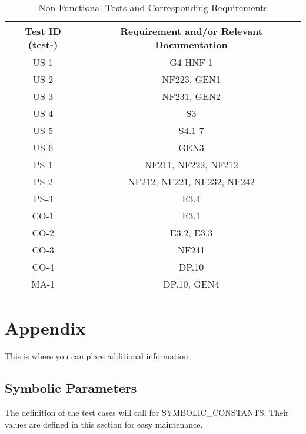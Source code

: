 \documentclass[12pt, titlepage]{article}
\begin{document}
\begin{table}[h!]
  \centering
  \caption{Non-Functional Tests and Corresponding Requirements}
  \begin{tabular}{c c}
    \hline
    \textbf{Test ID (test-)} & \textbf{Requirement and/or Relevant Documentation} \\ \hline
    US-1 & G4-HNF-1\\
    US-2 & NF223, GEN1\\
    US-3 & NF231, GEN2\\
    US-4 & S3\\
    US-5 & S4.1-7\\
    US-6 & GEN3\\
    PS-1 & NF211, NF222, NF212\\
    PS-2 & NF212, NF221, NF232, NF242\\
    PS-3 & E3.4\\
    CO-1 & E3.1\\
    CO-2 & E3.2, E3.3\\
    CO-3 & NF241\\
    CO-4 & DP.10\\
    MA-1 & DP.10, GEN4\\
  \end{tabular}
\end{table}

\newpage

\clearpage

				




\clearpage

\section{Appendix}

This is where you can place additional information.

\subsection{Symbolic Parameters}

The definition of the test cases will call for SYMBOLIC\_CONSTANTS.
Their values are defined in this section for easy maintenance.
\end{document}
